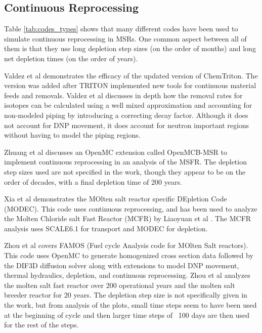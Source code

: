 \subsection{Continuous Reprocessing}
\label{litrev-msr-continuous}

Table \ref{tab:codes_types} shows that many different codes have been used to simulate continuous reprocessing in MSRs. One common aspect between all of them is that they use long depletion step sizes (on the order of months) and long net depletion times (on the order of years).

Valdez et al \cite{jr_vicente_valdez_modeling_2020} demonstrates the efficacy of the updated version of ChemTriton. The version was added after TRITON implemented new tools for continuous material feeds and removals. Valdez et al discusses in depth how the removal rates for isotopes can be calculated using a well mixed approximation and accounting for non-modeled piping by introducing a correcting decay factor. Although it does not account for DNP movement, it does account for neutron important regions without having to model the piping regions.

Zhuang et al \cite{zhuang_extended_2020} discusses an OpenMC extension called OpenMCB-MSR to implement continuous reprocessing in an analysis of the MSFR. The depletion step sizes used are not specified in the work, though they appear to be on the order of decades, with a final depletion time of 200 years.

Xia et al \cite{xia_development_2019} demonstrates the MOlten salt reactor specific DEpletion Code (MODEC). This code uses continuous reprocessing, and has been used to analyze the Molten Chloride salt Fast Reactor (MCFR) by Liaoyuan et al \cite{liaoyuan_th-u_2021}. The MCFR analysis uses SCALE6.1 for transport and MODEC for depletion.

Zhou et al \cite{zhou_fuel_2018} covers FAMOS (Fuel cycle Analysis code for MOlten Salt reactors). This code uses OpenMC to generate homogenized cross section data followed by the DIF3D diffusion solver along with extensions to model DNP movement, thermal hydraulics, depletion, and continuous reprocessing. Zhou et al analyzes the molten salt fast reactor over 200 operational years and the molten salt breeder reactor for 20 years. The depletion step size is not specifically given in the work, but from analysis of the plots, small time steps seem to have been used at the beginning of cycle and then larger time steps of ~100 days are then used for the rest of the steps.


